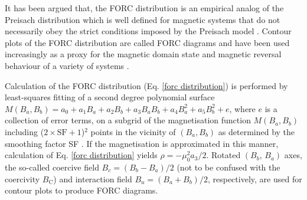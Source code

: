 It has been argued that, the FORC distribution is an empirical analog of the Preisach distribution which is well defined for magnetic systems that do not necessarily obey the strict conditions imposed by the Preisach model \citep{Mayergoyz1986}. Contour plots of the FORC distribution are called FORC diagrams and have been used increasingly as a proxy for the magnetic domain state and magnetic reversal behaviour of a variety of systems \citep{Pike1999,Pike2001,Roberts2000,Dumas2007,Egli2010,Egli2014,Biasi2016,Proenca2017,Zhao2017}.\par

Calculation of the FORC distribution (Eq. \ref{forc distribution}) is performed by least-squares fitting of a second degree polynomial surface $M(B_a,B_b)=a_0 + a_1 B_a + a_2 B_b + a_3 B_a B_b + a_4 B_a^2 + a_5 B_b^2 + e$, where $e$ is a collection of error terms, on a subgrid of the magnetisation function $M(B_a,B_b)$ including ($2\times\text{SF}+1$)$^2$ points in the vicinity of $(B_a, B_b)$ as determined by the smoothing factor SF \citep{Pike1999}. If the magnetisation is approximated in this manner, calculation of Eq. \ref{forc distribution} yields $\rho=-\mu_0^2 a_3 / 2$. Rotated $(B_b,\,B_a)$ axes, the so-called coercive field $B_c = (B_b - B_a)/2$ (not to be confused with the coercivity $B_\text{C}$) and interaction field $B_u = (B_a + B_b)/2$, respectively, are used for contour plots to produce FORC diagrams.\par

